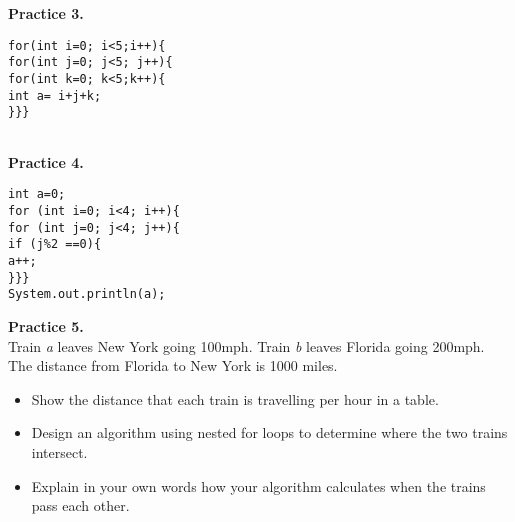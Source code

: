 \documentclass{article}
\begin{document}
\begin{flushleft}
\noindent \textbf{Practice 3.}\\
\begin{verbatim}
for(int i=0; i<5;i++){
for(int j=0; j<5; j++){
for(int k=0; k<5;k++){
int a= i+j+k;
}}}
\end{verbatim}

\begin{tabu} to 80mm { | X[l] | X[c] |  X[c] | X[c]  | X[l] | X[c] | X[l] | X[c] |  X[l] | X[c] | }
  \hline
  \hline
  \hline


  \hline
\end{tabu}




\noindent \textbf{Practice 4.}\\
\begin{verbatim}
int a=0;
for (int i=0; i<4; i++){
for (int j=0; j<4; j++){
if (j%2 ==0){
a++;
}}}
System.out.println(a);
\end{verbatim}

\noindent \textbf{Practice 5.}\\
Train \emph{a}  leaves New York going 100mph. Train \emph{b} leaves Florida going 200mph. The distance from Florida to New York is 1000 miles.\par 
\begin{itemize}
\item Show the distance that each train is travelling per hour in a  table.
\item Design an algorithm using nested for loops to determine where the two trains intersect. 
\item Explain in your own words how your algorithm calculates when the trains pass each other. 
\end{itemize}

\begin{verbatim}

\end{verbatim}







\begin{comment}
\begin{center}
\begin{tabular}{ c c c }
 cell1 & cell2 & cell3 \\ 
 cell4 & cell5 & cell6 \\  
 cell7 & cell8 & cell9    
\end{tabular}
\end{center}
\end{comment}


\end{flushleft}
\end{document}
